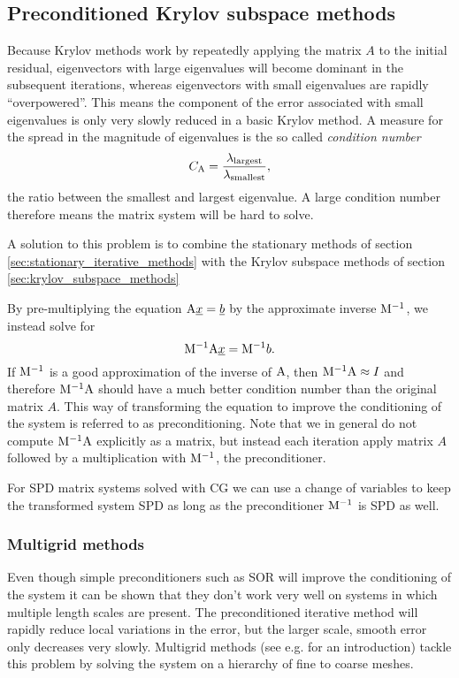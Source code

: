 \subsection{Preconditioned Krylov subspace methods} \label{ND_Preconditioners}
Because Krylov methods work by repeatedly applying the matrix
$A$ to the initial residual, eigenvectors with large
eigenvalues will become dominant in the subsequent iterations, whereas
eigenvectors with small eigenvalues are rapidly ``overpowered''. This
means the component of the error associated with small eigenvalues
is only very slowly reduced in a basic Krylov method. A measure for the
spread in the magnitude of eigenvalues is the so called
\emph{condition number}
\begin{equation*}
  C_{\mathrm{A}}=\frac{ \lambda_{\text{largest}} }
    { \lambda_{\text{smallest}} },
\end{equation*}
the ratio between the smallest and largest eigenvalue. A large
condition number therefore means the matrix system will be hard to solve.

A solution to this problem is to combine the stationary methods of
section \ref{sec:stationary_iterative_methods} with the
Krylov subspace methods of section \ref{sec:krylov_subspace_methods}

By pre-multiplying the equation
$\mathrm{A}\underline{x}=\underline{b}$ by the approximate inverse
$\mathrm{M}^{-1}$, we instead solve for
\begin{equation*}
  \mathrm{M}^{-1}\mathrm{A}\underline{x} = \mathrm{M}^{-1}b.
\end{equation*}
If $\mathrm{M}^{-1}$ is a good approximation of the inverse of $\mathrm{A}$,
then
$\mathrm{M}^{-1}\mathrm{A}\approx I$ and therefore $\mathrm{M}^{-1}\mathrm{A}$
should have a much better condition number than the
original matrix $A$. This way of transforming the equation to improve
the conditioning of the system is referred to as preconditioning. Note
that we in general do not compute $\mathrm{M}^{-1}\mathrm{A}$ explicitly
as a matrix, but instead each iteration
apply matrix $A$ followed by a multiplication
with $\mathrm{M}^{-1}$, the preconditioner.

For SPD matrix systems solved with CG we can use a change
of variables to keep the transformed system SPD as long as the
preconditioner $\mathrm{M}^{-1}$ is SPD as well.

\subsubsection{Multigrid methods}
Even though simple preconditioners such as SOR
will improve the conditioning of the system
it can be shown that they don't work very well on
systems in which multiple length scales are
present. The preconditioned iterative method will rapidly
reduce local variations in the error, but the larger
scale, smooth error only decreases very slowly. Multigrid methods
(see e.g. \cite{trottenberg2001} for an introduction)
tackle this problem by solving the system on a hierarchy of
fine to coarse meshes.

